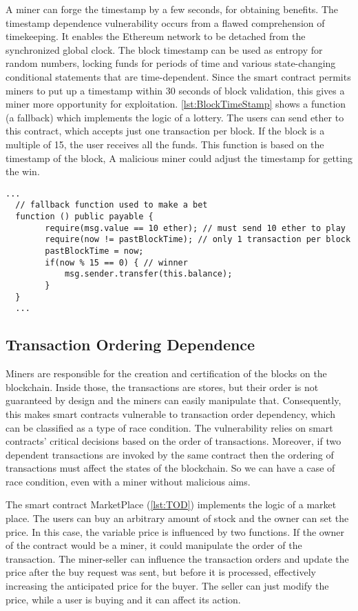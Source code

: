 \documentclass[a4paper,sigconf, language=french,
language=german, language=spanish, language=english]{acmart}
\begin{document}
A miner can forge the timestamp by a few seconds, for obtaining benefits. 
The timestamp dependence vulnerability occurs from a flawed comprehension of timekeeping. It enables the Ethereum network to be detached from the synchronized global clock. 
The block timestamp can be used as entropy for random numbers, locking funds for periods of time and various state-changing 
conditional statements that are time-dependent. Since the smart contract permits miners to put up a
timestamp within 30 seconds of block validation, this gives a miner more opportunity for exploitation.
\autoref{lst:BlockTimeStamp} shows a function (a fallback) which implements the logic of a lottery. The users can send ether to this contract, which 
accepts just one transaction per block. If the block is a multiple of 15, the user receives all the funds. This function is based on the timestamp of the block, 
A malicious miner could adjust the timestamp for getting the win.
\begin{lstlisting}[language=Solidity,caption={Block Timestamp},label={lst:BlockTimeStamp}]
  ...  
  // fallback function used to make a bet
  function () public payable {
        require(msg.value == 10 ether); // must send 10 ether to play
        require(now != pastBlockTime); // only 1 transaction per block
        pastBlockTime = now;
        if(now % 15 == 0) { // winner
            msg.sender.transfer(this.balance);
        }
  }
  ...
\end{lstlisting}

\subsection{Transaction Ordering Dependence} 

Miners are responsible for the creation and certification of the blocks on the blockchain. 
Inside those, the transactions are stores, but their order is not guaranteed by 
design and the miners can easily manipulate that. Consequently, this makes smart contracts vulnerable to transaction
order dependency, which can be classified as a type of race condition. The vulnerability relies on smart contracts' critical decisions 
based on the order of transactions. Moreover, if two dependent transactions are invoked by the same contract then the ordering of transactions must affect the states of the blockchain. 
So we can have a case of race condition, even with a miner without malicious aims.

The smart contract MarketPlace (\autoref{lst:TOD}) implements the logic of a market place. The users can buy an arbitrary amount of stock and the 
owner can set the price. In this case, the variable price is influenced by two functions. If the owner of the contract would be a miner, it could 
manipulate the order of the transaction. The miner-seller can inﬂuence the transaction orders and update the price after the buy request was 
sent, but before it is processed, eﬀectively increasing the anticipated price for the buyer. The seller can just modify the price, while a user is buying and it can affect its action.
\end{document}
